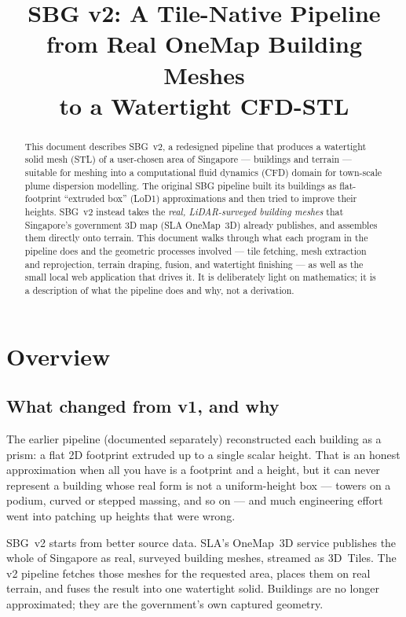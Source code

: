 \documentclass[11pt]{article}
\title{SBG v2: A Tile-Native Pipeline from Real OneMap Building Meshes\\
\large to a Watertight CFD-STL}
\author{}
\date{}
\begin{document}
\maketitle

\begin{abstract}
This document describes SBG~v2, a redesigned pipeline that produces a watertight solid mesh
(STL) of a user-chosen area of Singapore --- buildings and terrain --- suitable for meshing
into a computational fluid dynamics (CFD) domain for town-scale plume dispersion modelling.
The original SBG pipeline built its buildings as flat-footprint ``extruded box'' (LoD1)
approximations and then tried to improve their heights. SBG~v2 instead takes the
\emph{real, LiDAR-surveyed building meshes} that Singapore's government 3D map (SLA OneMap~3D)
already publishes, and assembles them directly onto terrain. This document walks through what
each program in the pipeline does and the geometric processes involved --- tile fetching,
mesh extraction and reprojection, terrain draping, fusion, and watertight finishing --- as
well as the small local web application that drives it. It is deliberately light on
mathematics; it is a description of what the pipeline does and why, not a derivation.
\end{abstract}

\tableofcontents

\section{Overview}

\subsection{What changed from v1, and why}

The earlier pipeline (documented separately) reconstructed each building as a prism: a flat 2D
footprint extruded up to a single scalar height. That is an honest approximation when all you
have is a footprint and a height, but it can never represent a building whose real form is not
a uniform-height box --- towers on a podium, curved or stepped massing, and so on --- and much
engineering effort went into patching up heights that were wrong.

SBG~v2 starts from better source data. SLA's OneMap~3D service publishes the whole of Singapore
as real, surveyed building meshes, streamed as 3D~Tiles. The v2 pipeline fetches those meshes
for the requested area, places them on real terrain, and fuses the result into one watertight
solid. Buildings are no longer approximated; they are the government's own captured geometry.
\end{document}

